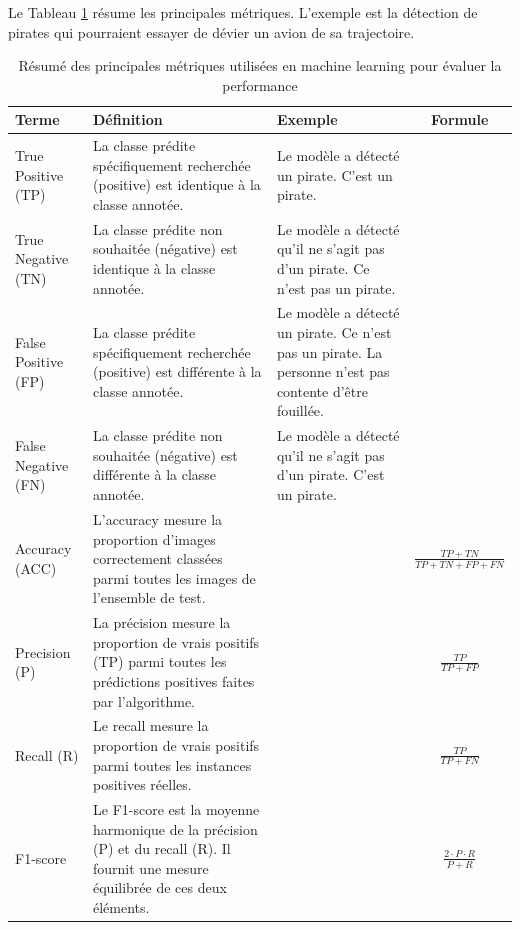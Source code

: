 Le Tableau \ref{tab:metriques_ml} résume les principales métriques. L'exemple est la détection de pirates qui pourraient essayer de dévier un avion de sa trajectoire.
\renewcommand{\arraystretch}{1.8}
\begin{table}[H]
    \centering
    \begin{tabular}{|p{2cm}|p{4cm}|p{4cm}|c|}
    \hline
    \textbf{Terme} & \textbf{Définition} & \textbf{Exemple} & \textbf{Formule} \\
    \hline
    True Positive (TP) & La classe prédite spécifiquement recherchée (positive) est identique à la classe annotée. & Le modèle a détecté un pirate. C'est un pirate. & \\
    \hline
    True Negative (TN) & La classe prédite non souhaitée (négative) est identique à la classe annotée. & Le modèle a détecté qu'il ne s'agit pas d'un pirate. Ce n'est pas un pirate. & \\
    \hline
    False Positive (FP) & La classe prédite spécifiquement recherchée (positive) est différente à la classe annotée. & Le modèle a détecté un pirate. Ce n'est pas un pirate. La personne n'est pas contente d'être fouillée. & \\
    \hline
    False Negative (FN) & La classe prédite non souhaitée (négative) est différente à la classe annotée. & Le modèle a détecté qu'il ne s'agit pas d'un pirate. C'est un pirate. & \\
    \hline
    Accuracy (ACC) & L'accuracy mesure la proportion d'images correctement classées parmi toutes les images de l'ensemble de test. & & {\small$\displaystyle\frac{TP + TN}{TP + TN + FP + FN}$} \\
    \hline
    Precision (P) & La précision mesure la proportion de vrais positifs (TP) parmi toutes les prédictions positives faites par l'algorithme. & & {\small$\displaystyle\frac{TP}{TP + FP}$} \\
    \hline
    Recall (R) & Le recall mesure la proportion de vrais positifs parmi toutes les instances positives réelles. & & {\small$\displaystyle\frac{TP}{TP + FN}$} \\
    \hline
    F1-score & Le F1-score est la moyenne harmonique de la précision (P) et du recall (R). Il fournit une mesure équilibrée de ces deux éléments. & & {\small$\displaystyle\frac{2 \cdot P \cdot R}{P + R}$} \\
    \hline
    \end{tabular}
    \caption{Résumé des principales métriques utilisées en machine learning pour évaluer la performance}
    \label{tab:metriques_ml}
\end{table}

